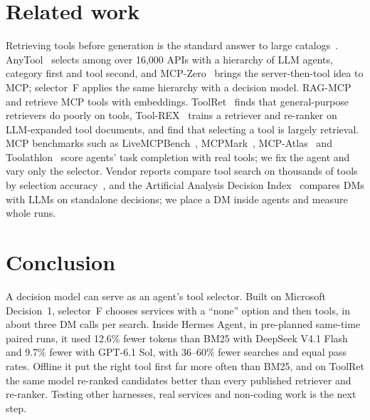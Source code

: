 \documentclass[11pt]{article}
\newcommand{\msd}{Microsoft Decision~1}
\newcommand{\F}{selector~F}
\begin{document}
\section{Related work}\label{sec:related}
Retrieving tools before generation is the standard answer to large catalogs~\citep{qin2023toolllm,oats2026}.
AnyTool~\citep{du2024anytool} selects among over 16{,}000 APIs with a hierarchy of LLM agents, category first and tool
second, and MCP-Zero~\citep{fei2025mcpzero} brings the server-then-tool idea to MCP; \F{} applies the same hierarchy with
a decision model. RAG-MCP~\citep{gan2025ragmcp} and \citet{mudunuri2026semantic} retrieve MCP tools with embeddings.
ToolRet~\citep{shi2025toolret} finds that general-purpose retrievers do poorly on tools, Tool-REX~\citep{lu2026toolrex}
trains a retriever and re-ranker on LLM-expanded tool documents, and \citet{selection2026retrieval} find that selecting
a tool is largely retrieval. MCP benchmarks such as LiveMCPBench~\citep{mo2025livemcpbench},
MCPMark~\citep{wu2025mcpmark}, MCP-Atlas~\citep{mcpatlas2026} and Toolathlon~\citep{toolathlon2025} score agents'
task completion with real tools; we fix the agent and vary only the selector. Vendor reports compare tool search on
thousands of tools by selection accuracy~\citep{stacklok2025optimizer,arcade2025toolsearch}, and the Artificial Analysis
Decision Index~\citep{aa2026decisionindex,olson2026decision} compares DMs with LLMs on standalone decisions; we place a
DM inside agents and measure whole runs.

\section{Conclusion}\label{sec:conclusion}
A decision model can serve as an agent's tool selector. Built on \msd{}, \F{} chooses services with a ``none'' option and
then tools, in about three DM calls per search. Inside Hermes Agent, in pre-planned same-time paired runs, it used
12.6\% fewer tokens than BM25 with DeepSeek V4.1 Flash and 9.7\% fewer with GPT-6.1 Sol, with 36--60\% fewer searches
and equal pass rates. Offline it put the right tool first far more often than BM25, and on ToolRet the same model
re-ranked candidates better than every published retriever and re-ranker. Testing other harnesses, real services and
non-coding work is the next step.
\end{document}
